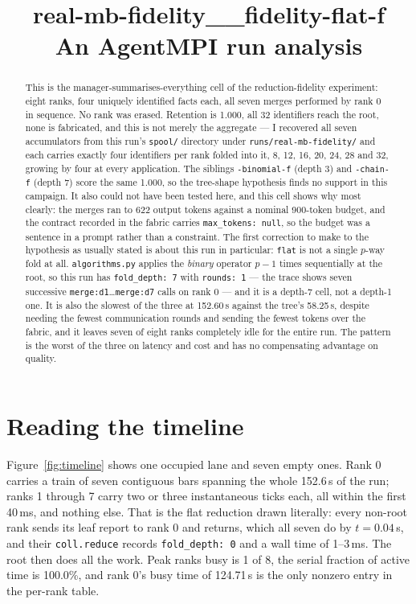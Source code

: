 \documentclass[11pt]{article}
\title{\textbf{real-mb-fidelity\_\_fidelity-flat-f}\\[2pt]\large An AgentMPI run analysis}
\author{}
\date{}
\begin{document}
\maketitle

\begin{abstract}
This is the manager-summarises-everything cell of the reduction-fidelity experiment:
eight ranks, four uniquely identified facts each, all seven merges performed by rank 0
in sequence. No rank was erased. Retention is 1.000, all 32 identifiers reach the root,
none is fabricated, and this is not merely the aggregate --- I recovered all seven
accumulators from this run's \texttt{spool/} directory under
\texttt{runs/real-mb-fidelity/} and each carries
exactly four identifiers per rank folded into it, 8, 12, 16, 20, 24, 28 and 32, growing
by four at every application. The siblings \texttt{-binomial-f} (depth 3) and
\texttt{-chain-f} (depth 7) score the same 1.000, so the tree-shape hypothesis finds no
support in this campaign. It also could not have been tested here, and this cell shows
why most clearly: the merges ran to 622 output tokens against a nominal 900-token
budget, and the contract recorded in the fabric carries \texttt{max\_tokens: null}, so
the budget was a sentence in a prompt rather than a constraint. The first correction to
make to the hypothesis as usually stated is about this run in particular: \texttt{flat}
is not a single $p$-way fold at all. \texttt{algorithms.py} applies the \emph{binary}
operator $p-1$ times sequentially at the root, so this run has \texttt{fold\_depth: 7}
with \texttt{rounds: 1} --- the trace shows seven successive
\texttt{merge:d1}\dots\texttt{merge:d7} calls on rank 0 --- and it is a depth-7 cell,
not a depth-1 one. It is also the slowest of the three at 152.60\,s against the tree's
58.25\,s, despite needing the fewest communication rounds and sending the fewest tokens
over the fabric, and it leaves seven of eight ranks completely idle for the entire run.
The pattern is the worst of the three on latency and cost and has no compensating
advantage on quality.
\end{abstract}



\section{Reading the timeline}

Figure~\ref{fig:timeline} shows one occupied lane and seven empty ones. Rank 0 carries a
train of seven contiguous bars spanning the whole 152.6\,s of the run; ranks 1 through 7
carry two or three instantaneous ticks each, all within the first 40\,ms, and nothing
else. That is the flat reduction drawn literally: every non-root rank sends its leaf
report to rank 0 and returns, which all seven do by $t = 0.04$\,s, and their
\texttt{coll.reduce} records \texttt{fold\_depth: 0} and a wall time of 1--3\,ms. The
root then does all the work. Peak ranks busy is 1 of 8, the serial fraction of active
time is 100.0\%, and rank 0's busy time of 124.71\,s is the only nonzero entry in the
per-rank table.
\end{document}
